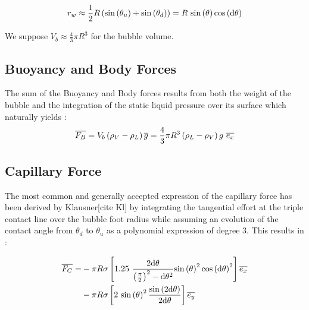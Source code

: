 \begin{equation}
r_{w}\approx \frac{1}{2} R\left( \mathrm{sin}\left( \theta_{u} \right) + \mathrm{sin}\left( \theta_{d} \right)  \right)=R~\mathrm{sin}\left( \theta \right)\mathrm{cos}\left( \mathrm{d}\theta \right)
\end{equation}

We suppose $V_{b}\approx\frac{4}{3}\pi R^{3}$ for the bubble volume.

\subsection{Buoyancy and Body Forces}

The sum of the Buoyancy and Body forces results from both the weight of the bubble and the integration of the static liquid pressure over its surface which naturally yields :
\begin{equation}
\label{eq:buoyancy}
\overline{F_{B}}=V_{b}\left( \rho_{V}-\rho_{L} \right)\overline{g}=\frac{4}{3}\pi R^{3}\left( \rho_{L}-\rho_{V} \right)g \ \overline{e_{x}}
\end{equation}

\subsection{Capillary Force}\label{subsec:FC}

The most common and generally accepted expression of the capillary force has been derived by Klausner[cite Kl] by integrating the tangential effort at the triple contact line over the bubble foot radius while assuming an evolution of the contact angle from $\theta_{d}$ to $\theta_{u}$ as a polynomial expression of degree 3. This results in :

\begin{align}
\nonumber \vect{F_{C}}=&-\pi R \sigma \crocht{1.25\ \frac{2\dtheta}{\parth{\frac{\pi}{2}}^{2}-\dtheta^{2}}\sin{\theta}^{2}\cos{\dtheta}^{2}} \vect{e_{x}}\\
%
& - \pi R \sigma \crocht{2\ \sin{\theta}^{2}\frac{\sin{2\dtheta}}{2\dtheta}}\vect{e_{y}}
\end{align}


